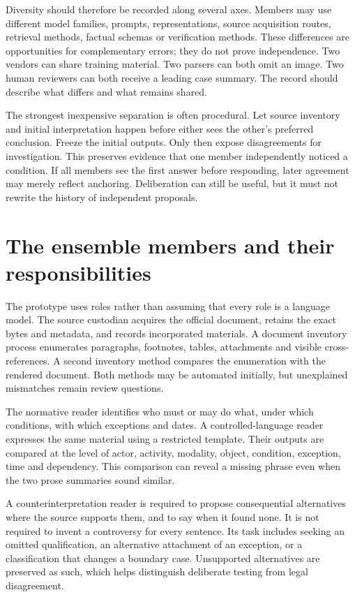 \documentclass[12pt,a4paper,oneside,openany]{book}
\begin{document}
Diversity should therefore be recorded along several axes. Members may use
different model families, prompts, representations, source acquisition routes,
retrieval methods, factual schemas or verification methods. These differences are
opportunities for complementary errors; they do not prove independence. Two
vendors can share training material. Two parsers can both omit an image. Two human
reviewers can both receive a leading case summary. The record should describe
what differs and what remains shared.

The strongest inexpensive separation is often procedural. Let source inventory
and initial interpretation happen before either sees the other's preferred
conclusion. Freeze the initial outputs. Only then expose disagreements for
investigation. This preserves evidence that one member independently noticed a
condition. If all members see the first answer before responding, later agreement
may merely reflect anchoring. Deliberation can still be useful, but it must not
rewrite the history of independent proposals.

\section{The ensemble members and their responsibilities}
\label{merge:M06:02}


The prototype uses roles rather than assuming that every role is a language
model. The source custodian acquires the official document, retains the exact
bytes and metadata, and records incorporated materials. A document inventory
process enumerates paragraphs, footnotes, tables, attachments and visible
cross-references. A second inventory method compares the enumeration with the
rendered document. Both methods may be automated initially, but unexplained
mismatches remain review questions.

The normative reader identifies who must or may do what, under which conditions,
with which exceptions and dates. A controlled-language reader expresses the same
material using a restricted template. Their outputs are compared at the level
of actor, activity, modality, object, condition, exception, time and dependency.
This comparison can reveal a missing phrase even when the two prose summaries
sound similar.

A counterinterpretation reader is required to propose consequential alternatives
where the source supports them, and to say when it found none. It is not required
to invent a controversy for every sentence. Its task includes seeking an omitted
qualification, an alternative attachment of an exception, or a classification
that changes a boundary case. Unsupported alternatives are preserved as such,
which helps distinguish deliberate testing from legal disagreement.
\end{document}
